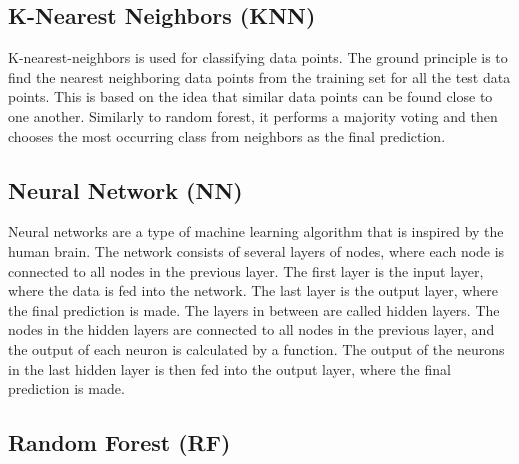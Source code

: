 \documentclass{kththesis}
\begin{document}



\subsection{K-Nearest Neighbors (KNN)}

K-nearest-neighbors is used for classifying data points. The ground principle is to find the nearest neighboring data points from the training set for all the test data points. This is based on the idea that similar data points can be found close to one another. Similarly to random forest, it performs a majority voting and then chooses the most occurring class from neighbors as the final prediction. \parencite{ibmknn}


\subsection{Neural Network (NN)}

Neural networks are a type of machine learning algorithm that is inspired by the human brain. The network consists of several layers of nodes, where each node is connected to all nodes in the previous layer. The first layer is the input layer, where the data is fed into the network. The last layer is the output layer, where the final prediction is made. The layers in between are called hidden layers. The nodes in the hidden layers are connected to all nodes in the previous layer, and the output of each neuron is calculated by a function. The output of the neurons in the last hidden layer is then fed into the output layer, where the final prediction is made. \parencite{ibmWhatNeural}



\subsection{Random Forest (RF)}
\end{document}
